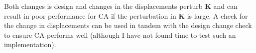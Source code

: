 \begin{minipage}[y]{0.7\textwidth}
Both changes is design and changes in the displacements perturb $\bm K$ and can result in poor performance for CA if the perturbation in $\bm K$ is large. A check for the change in displacements can be used in tandem with the design change check to ensure CA performs well (although I have not found time to test such an implementation).
\end{minipage}
